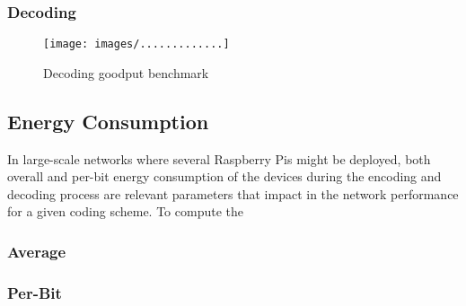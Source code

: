 \subsubsection{Decoding}

\begin{figure}[ht!]
\centering
\texttt{[image: images/.............]}
\caption{Decoding goodput benchmark}
\label{fig:dec_goodput_benchmark}
\end{figure}

\subsection{Energy Consumption}
In large-scale networks where several Raspberry Pis might be deployed,
both overall and per-bit energy consumption of the devices during the
encoding and decoding process are relevant parameters that impact in the
network performance for a given coding scheme. To compute the

\subsubsection{Average}
\subsubsection{Per-Bit}